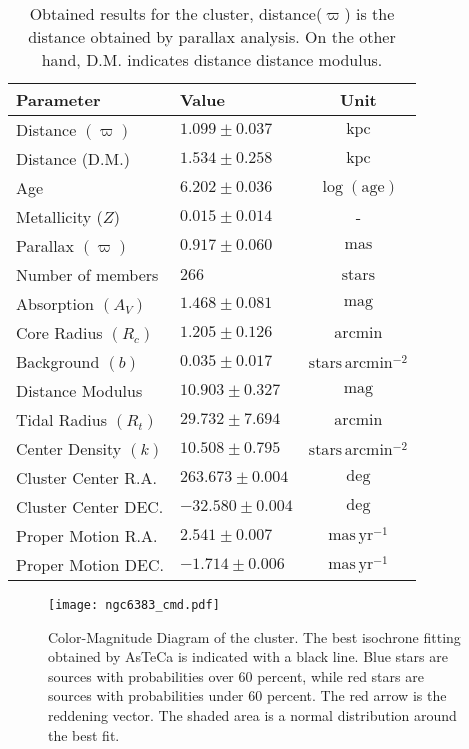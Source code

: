 \documentclass[baaa]{baaa}
\begin{document}
\begin{table}[!t]
\centering
\caption{Obtained results for the cluster, distance($\varpi$) is the distance obtained by parallax analysis. On the other hand, D.M. indicates distance distance modulus.}
\begin{tabular}{llc}
\hline\hline\noalign{\smallskip}
\textbf{Parameter} & \textbf{Value} & \textbf{Unit} \\ \hline\noalign{\smallskip}
Distance $(\varpi)$ & $1.099 \pm 0.037$ & $\mathrm{kpc}$ \\
Distance (D.M.) & $1.534 \pm 0.258$ & $\mathrm{kpc}$ \\
Age & $6.202 \pm 0.036$ & $\log(\mathrm{age})$ \\
Metallicity ($Z$) & $0.015 \pm 0.014$ & - \\
Parallax $(\varpi)$ & $0.917 \pm 0.060$ & $\mathrm{mas}$ \\
Number of members & $266$ & $\mathrm{stars}$ \\
Absorption $(A_V)$ & $1.468 \pm 0.081$ & $\mathrm{mag}$ \\
Core Radius $(R_c)$ & $1.205 \pm 0.126$ & $\mathrm{arcmin}$ \\
Background $(b)$ & $0.035 \pm 0.017$ & $\mathrm{stars\,arcmin^{-2}}$ \\
Distance Modulus & $10.903 \pm 0.327$ & $\mathrm{mag}$ \\
Tidal Radius $(R_t)$ & $29.732 \pm 7.694$ & $\mathrm{arcmin}$ \\
Center Density $(k)$ & $10.508 \pm 0.795$ & $\mathrm{stars\,arcmin^{-2}}$ \\
Cluster Center R.A. & $263.673 \pm 0.004$ & $\mathrm{deg}$ \\
Cluster Center DEC. & $-32.580 \pm 0.004$ & $\mathrm{deg}$ \\
Proper Motion R.A. & $2.541 \pm 0.007$ & $\mathrm{mas\,yr^{-1}}$ \\
Proper Motion DEC. & $-1.714 \pm 0.006$ & $\mathrm{mas\,yr^{-1}}$ \\ \hline
\end{tabular}
\label{tab:ngc6383_results}
\end{table}

\begin{figure}
    \centering
    \texttt{[image: ngc6383\_cmd.pdf]}
    \caption{Color-Magnitude Diagram of the cluster. The best isochrone fitting obtained by AsTeCa is indicated with a black line. Blue stars are sources with probabilities over 60 percent, while red stars are sources with probabilities under 60 percent. The red arrow is the reddening vector. The shaded area is a normal distribution around the best fit.}
    \label{fig:cmd}
\end{figure}
\end{document}
